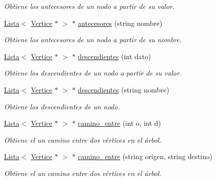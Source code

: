 \begin{DoxyCompactItemize}
\begin{DoxyCompactList}\small\item\em Obtiene los antecesores de un nodo a partir de su valor. \end{DoxyCompactList}\item 
\hyperlink{classLista}{Lista}$<$ \hyperlink{classVertice}{Vertice} $\ast$ $>$ $\ast$ \hyperlink{classArbol_aa975d5d9cf5fcfc392a8200bd0078d1c}{antecesores} (string nombre)
\begin{DoxyCompactList}\small\item\em Obtiene los antecesores de un nodo a partir de su nombre. \end{DoxyCompactList}\item 
\hyperlink{classLista}{Lista}$<$ \hyperlink{classVertice}{Vertice} $\ast$ $>$ $\ast$ \hyperlink{classArbol_acae8e9dfd17ae18e250d9029172e1c9e}{descendientes} (int dato)
\begin{DoxyCompactList}\small\item\em Obtiene los descendientes de un nodo a partir de su valor. \end{DoxyCompactList}\item 
\hyperlink{classLista}{Lista}$<$ \hyperlink{classVertice}{Vertice} $\ast$ $>$ $\ast$ \hyperlink{classArbol_a790b07f284b14bd179499eb4a991ad86}{descendientes} (string nombre)
\begin{DoxyCompactList}\small\item\em Obtiene los descendientes de un nodo. \end{DoxyCompactList}\item 
\hyperlink{classLista}{Lista}$<$ \hyperlink{classVertice}{Vertice} $\ast$ $>$ $\ast$ \hyperlink{classArbol_accfa606c5f5e67b6ab18c4490075cf39}{camino\+\_\+entre} (int o, int d)
\begin{DoxyCompactList}\small\item\em Obtiene el un camino entre dos vértices en el árbol. \end{DoxyCompactList}\item 
\hyperlink{classLista}{Lista}$<$ \hyperlink{classVertice}{Vertice} $\ast$ $>$ $\ast$ \hyperlink{classArbol_aef0f680828ac573af495b98d2eb09c12}{camino\+\_\+entre} (string origen, string destino)
\begin{DoxyCompactList}\small\item\em Obtiene el un camino entre dos vértices en el árbol. \end{DoxyCompactList}\end{DoxyCompactItemize}
